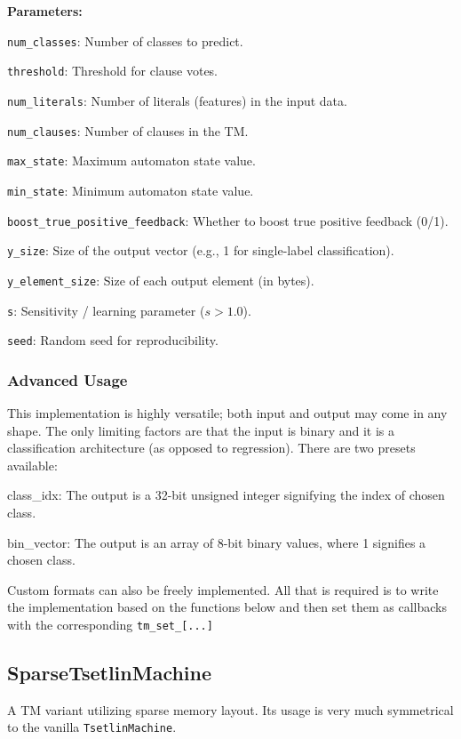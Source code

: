 \textbf{Parameters:}
\begin{compactitem}
    \item \texttt{num\_classes}: Number of classes to predict.
    \item \texttt{threshold}: Threshold for clause votes.
    \item \texttt{num\_literals}: Number of literals (features) in the input data.
    \item \texttt{num\_clauses}: Number of clauses in the TM.
    \item \texttt{max\_state}: Maximum automaton state value.
    \item \texttt{min\_state}: Minimum automaton state value.
    \item \texttt{boost\_true\_positive\_feedback}: Whether to boost true positive feedback (0/1).
    \item \texttt{y\_size}: Size of the output vector (e.g., 1 for single-label classification).
    \item \texttt{y\_element\_size}: Size of each output element (in bytes).
    \item \texttt{s}: Sensitivity / learning parameter ($s > 1.0$).
    \item \texttt{seed}: Random seed for reproducibility.
\end{compactitem}

\subsubsection{Advanced Usage}

This implementation is highly versatile; both input and output may come in any shape. The only limiting factors are that the input is binary and it is a classification architecture (as opposed to regression). 
There are two presets available:
\begin{compactenum}
    \item class\_idx: The output is a 32-bit unsigned integer signifying the index of chosen class.
    \item bin\_vector: The output is an array of 8-bit binary values, where 1 signifies a chosen class.
\end{compactenum}
Custom formats can also be freely implemented. All that is required is to write the implementation based on the functions below and then set them as callbacks with the corresponding \texttt{tm\_set\_[...]}

\subsection{SparseTsetlinMachine}
A TM variant utilizing sparse memory layout. Its usage is very much symmetrical to the vanilla \texttt{TsetlinMachine}.

